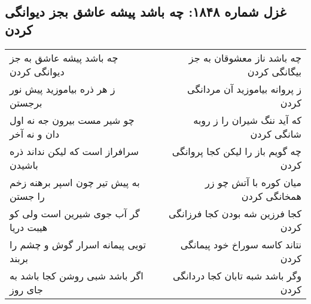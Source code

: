 \begin{center}
\section*{غزل شماره ۱۸۴۸: چه باشد پیشه عاشق بجز دیوانگی کردن}
\label{sec:1848}
\begin{longtable}{l p{0.5cm} r}
چه باشد پیشه عاشق به جز دیوانگی کردن
&&
چه باشد ناز معشوقان به جز بیگانگی کردن
\\
ز هر ذره بیاموزید پیش نور برجستن
&&
ز پروانه بیاموزید آن مردانگی کردن
\\
چو شیر مست بیرون جه نه اول دان و نه آخر
&&
که آید ننگ شیران را ز روبه شانگی کردن
\\
سرافراز است که لیکن نداند ذره باشیدن
&&
چه گویم باز را لیکن کجا پروانگی کردن
\\
به پیش تیر چون اسپر برهنه زخم را جستن
&&
میان کوره با آتش چو زر همخانگی کردن
\\
گر آب جوی شیرین است ولی کو هیبت دریا
&&
کجا فرزین شه بودن کجا فرزانگی کردن
\\
تویی پیمانه اسرار گوش و چشم را بربند
&&
نتاند کاسه سوراخ خود پیمانگی کردن
\\
اگر باشد شبی روشن کجا باشد به جای روز
&&
وگر باشد شبه تابان کجا دردانگی کردن
\\
\end{longtable}
\end{center}
